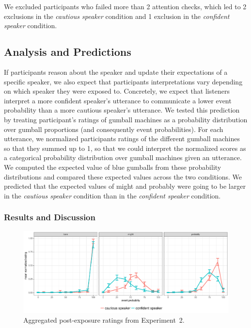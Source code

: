 \documentclass[lucida,biblatex]{sp} %
\begin{document}
We excluded participants who failed more than 2 attention checks, which led to 2 exclusions in the \emph{cautious speaker} condition and 1 exclusion in the \emph{confident speaker} condition.


\subsection{Analysis and Predictions}

If participants reason about the speaker and update their expectations of a specific speaker, we also expect that participants interpretations 
vary depending on which speaker they were exposed to. Concretely, we expect that listeners interpret a more confident speaker's utterance 
to communicate a lower event probability than a more cautious speaker's utterance. We tested this prediction by treating participant's ratings 
of gumball machines as a probability distribution over gumball proportions (and consequently event probabilities).  For each utterance, we 
normalized participants ratings of the different gumball machines so that they summed up to 1, so that we could interpret the normalized scores 
as a categorical probability distribution over gumball machines given an utterance. We computed the expected value of blue gumballs from these probability distributions and compared these expected values across the two conditions. We predicted that the expected values of {\sc might} and {\sc probably} were going to be larger in the \emph{cautious speaker} condition than in the \emph{confident speaker} condition.

\subsubsection{Results and Discussion}

\begin{figure}
\includegraphics[width=\textwidth]{plots/exp-2-ratings.pdf}
\caption{Aggregated post-exposure ratings from Experiment~2.  \label{fig:adaptation-results-comp}}
\end{figure}
\end{document}
